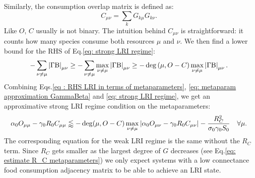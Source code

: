 \documentclass[12pt, titlepage]{report}
\begin{document}
Similarly, the consumption overlap matrix is defined as:
\begin{equation}
C_{\mu\nu}=\sum_k G_{k \mu}G_{k \nu}.
\end{equation}
Like $O$, $C$ usually is not binary. The intuition behind $C_{\mu\nu}$ is straightforward: it counts how many species consume both resources $\mu$ and $\nu$.
We then find a lower bound for the RHS of Eq.\eqref{eq: strong LRI regime}:
\begin{equation}
-\sum_{\nu\neq\mu}\left|{\Gamma\text{B}}\right|_{\mu\nu} \geq - \sum_{\nu \neq \mu} \max_{\nu \neq \mu} \left|{\Gamma\text{B}}\right|_{\mu\nu} \geq - \deg\left(\mu, O-C \right) \max_{\nu \neq \mu} \left|{\Gamma\text{B}}\right|_{\mu\nu}. \label{eq : RHS LRI in terms of metaparameters}
\end{equation}
Combining Eqs.\eqref{eq : RHS LRI in terms of metaparameters}, \eqref{eq: metaparam approximation GammaBeta} and \eqref{eq: strong LRI regime}, we get an approximative strong LRI regime condition on the metaparameters:
\begin{equation}{
\alpha_0 O_{\mu \mu}-\gamma_0R_0 C_{\mu\mu} \lessapprox - \deg(\mu, O-C) \max_{\nu\neq\mu}\left|{\alpha_0 O_{\mu \nu}-\gamma_0 R_0 C_{\mu\nu}}\right|-\frac{R_C^2}{\sigma_0\gamma_0 S_0} \quad \forall \mu.
}\label{eq: LRI metaparams sufficient}
\end{equation}
The corresponding equation for the weak LRI regime is the same without the $R_C$ term.
Since $R_C$ gets smaller as the largest degree of $G$ decreases (see Eq.\ref{eq: estimate R_C metaparameters}) we only expect systems with a low connectance food consumption adjacency matrix to be able to achieve an LRI state.
\end{document}
